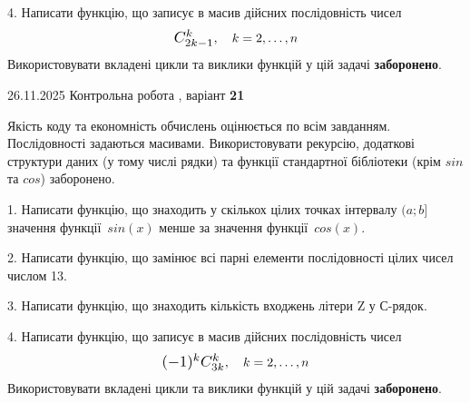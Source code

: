 \documentclass[11pt, ukrainian]{article}
\begin{document}
{{{{{{{{{{{{{{{{{{{{\begin {large}
4. 
Написати функцію, що записує в масив дійсних послідовність чисел
$$\scalebox{1.2}{$C_{2k-1}^{k}$}, \quad k=2,\ldots,n$$
\quad Використовувати вкладені цикли та виклики функцій у цій задачі \textbf{заборонено}.

\vspace{2mm}

\end{large}
\vspace{20mm}


{{26.11.2025 Контрольна робота , варіант  \No \textbf { 21 }\par}}


{
Якість коду та економність обчислень оцінюється по всім завданням. Послідовності задаються масивами. Використовувати рекурсію, додаткові структури даних (у тому числі рядки) та функції стандартної бібліотеки (крім $sin$ та $cos$) заборонено.

\vspace{2mm}

\begin {large}
1. Написати функцію, що знаходить у скількох цілих точках інтервалу $(a; b]$ значення функції~$sin(x)$ менше за значення функції~$cos(x)$.

\vspace{2mm}


2. Написати функцію, що замінює всі парні елементи послідовності цілих чисел числом 13.

\vspace{2mm}


3. Написати функцію, що знаходить кількість входжень літери Z у С-рядок.

\vspace{2mm}


4. 
Написати функцію, що записує в масив дійсних послідовність чисел
$$\scalebox{1.2}{$(-1)^{k}C_{3k}^{k}$}, \quad k=2,\ldots,n$$
\quad Використовувати вкладені цикли та виклики функцій у цій задачі \textbf{заборонено}.

\vspace{2mm}


\end{large}}}}}}}}}}}}}}}}}}}}}}
\end{document}
